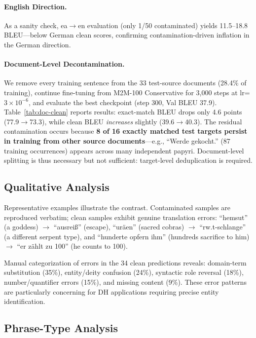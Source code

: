 \documentclass[11pt,a4paper]{article}
\begin{document}
\paragraph{English Direction.} As a sanity check, ea$\rightarrow$en evaluation (only 1/50 contaminated) yields 11.5--18.8 BLEU---below German clean scores, confirming contamination-driven inflation in the German direction.

\paragraph{Document-Level Decontamination.}
We remove every training sentence from the 33 test-source documents (28.4\% of training), continue fine-tuning from M2M-100 Conservative for 3,000 steps at lr=$3{\times}10^{-6}$, and evaluate the best checkpoint (step 300, Val BLEU 37.9).
Table~\ref{tab:doc-clean} reports results: exact-match BLEU drops only 4.6 points (77.9$\rightarrow$73.3), while clean BLEU \emph{increases} slightly (39.6$\rightarrow$40.3). The residual contamination occurs because \textbf{8 of 16 exactly matched test targets persist in training from other source documents}---e.g., ``Werde gekocht.'' (87 training occurrences) appears across many independent papyri. Document-level splitting is thus necessary but not sufficient: target-level deduplication is required.



\subsection{Qualitative Analysis}
\label{sec:results-qualitative}

Representative examples illustrate the contrast. Contaminated samples are reproduced verbatim; clean samples exhibit genuine translation errors: ``hemsut'' (a goddess) $\rightarrow$ ``ausreiß'' (escape), ``uräen'' (sacred cobras) $\rightarrow$ ``rw.t-schlange'' (a different serpent type), and ``hunderte opfern ihm'' (hundreds sacrifice to him) $\rightarrow$ ``er zählt zu 100'' (he counts to 100).

Manual categorization of errors in the 34 clean predictions reveals: domain-term substitution (35\%), entity/deity confusion (24\%), syntactic role reversal (18\%), number/quantifier errors (15\%), and missing content (9\%). These error patterns are particularly concerning for DH applications requiring precise entity identification.

\subsection{Phrase-Type Analysis}
\label{sec:results-phrase}
\end{document}
